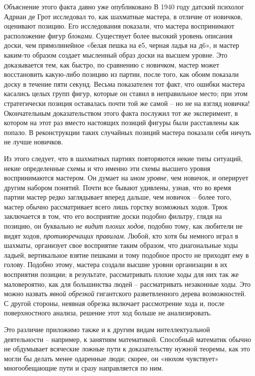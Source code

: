 \documentclass[../main.tex]{subfiles}
\begin{document}
Объяснение этого факта давно уже опубликовано В 1940 году датский психолог Адриан де Грот исследовал то, как шахматные мастера, в отличие от новичков, оценивают позицию. Его исследования показали, что мастера воспринимают расположение фигур \emph{блоками}. Существует более высокий уровень описания доски, чем прямолинейное «белая пешка на е5, черная ладья на д6», и мастер каким-то образом создает мысленный образ доски на высшем уровне. Это доказывается тем, как быстро, по сравнению с новичком, мастер может восстановить какую-либо позицию из партии, после того, как обоим показали доску в течение пяти секунд. Весьма показателен тот факт, что ошибки мастера касались целых групп фигур, которые он ставил в неправильное место; при этом стратегически позиция оставалась почти той же самой \--- но не на взгляд новичка! Окончательным доказательством этого факта послужил тот же эксперимент, в котором на этот раз вместо настоящих позиций фигуры были расставлены как попало. В реконструкции таких случайных позиций мастера показали себя ничуть не лучше новичков.

Из этого следует, что в шахматных партиях повторяются некие типы ситуаций, некие определенные схемы и что именно эти схемы высшего уровня воспринимаются мастером. Он думает на \emph{ином уровне}, чем новичок, и оперирует другим набором понятий. Почти все бывают удивлены, узнав, что во время партии мастер редко заглядывает вперед дальше, чем новичок \--- более того, мастер обычно рассматривает всего лишь горстку возможных ходов. Трюк заключается в том, что его восприятие доски подобно фильтру, глядя на позицию, он буквально \emph{не видит плохих ходов}, подобно тому, как любители не видят ходов, \emph{противоречащих правилам}. Любой, кто хотя бы немного играл в шахматы, организует свое восприятие таким образом, что диагональные ходы ладьей, вертикальное взятие пешками и тому подобное просто не приходят ему в голову. Подобно этому, мастера создали высшие уровни организации в их восприятии позиции; в результате, рассматривать плохие ходы для них так же маловероятно, как для большинства людей \--- рассматривать незаконные ходы. Это можно назвать \emph{явной обрезкой} гигантского разветвленного дерева возможностей. С другой стороны, неявная обрезка включает рассмотрение хода и, после поверхностного анализа, решение этот ход больше не анализировать.

Это различие приложимо также и к другим видам интеллектуальной деятельности \--- например, к занятиям математикой. Способный математик обычно не обдумывает всяческие ложные пути к доказательству нужной теоремы, как это могли бы делать менее одаренные люди; скорее, он «нюхом чувствует» многообещающие пути и сразу направляется по ним.
\end{document}
